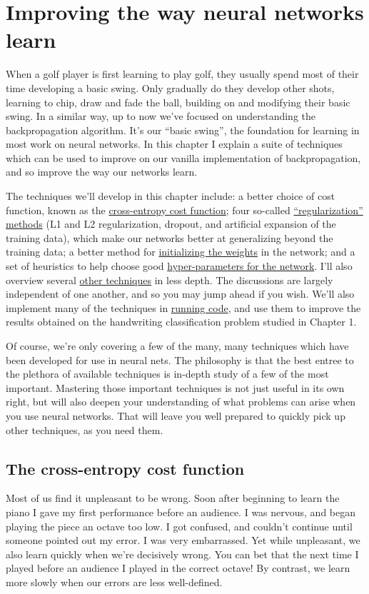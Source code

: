 \documentclass[a4paper,twoside,10pt]{book}
\begin{document}
\chapter{Improving the way neural networks learn}
\label{sec:3.1}
When a golf player is first learning to play golf, they usually spend most of their time developing a basic swing. Only gradually do they develop other shots, learning to chip, draw and fade the ball, building on and modifying their basic swing. In a similar way, up to now we've focused on understanding the backpropagation algorithm. It's our ``basic swing'', the foundation for learning in most work on neural networks. In this chapter I explain a suite of techniques which can be used to improve on our vanilla implementation of backpropagation, and so improve the way our networks learn.

The techniques we'll develop in this chapter include: a better choice of cost function, known as the \hyperref[sec:3.1]{cross-entropy cost function}; four so-called \hyperref[sec:3.2]{``regularization'' methods} (L1 and L2 regularization, dropout, and artificial expansion of the training data), which make our networks better at generalizing beyond the training data; a better method for \hyperref[sec:3.3]{initializing the weights} in the network; and a set of heuristics to help choose good \hyperref[sec:3.5]{hyper-parameters for the network}. I'll also overview several \hyperref[sec:3.6]{other techniques} in less depth. The discussions are largely independent of one another, and so you may jump ahead if you wish. We'll also implement many of the techniques in \hyperref[sec:3.4]{running code}, and use them to improve the results obtained on the handwriting classification problem studied in Chapter 1.

Of course, we're only covering a few of the many, many techniques which have been developed for use in neural nets. The philosophy is that the best entree to the plethora of available techniques is in-depth study of a few of the most important. Mastering those important techniques is not just useful in its own right, but will also deepen your understanding of what problems can arise when you use neural networks. That will leave you well prepared to quickly pick up other techniques, as you need them.

\section{The cross-entropy cost function}
Most of us find it unpleasant to be wrong. Soon after beginning to learn the piano I gave my first performance before an audience. I was nervous, and began playing the piece an octave too low. I got confused, and couldn't continue until someone pointed out my error. I was very embarrassed. Yet while unpleasant, we also learn quickly when we're decisively wrong. You can bet that the next time I played before an audience I played in the correct octave! By contrast, we learn more slowly when our errors are less well-defined.
\end{document}
